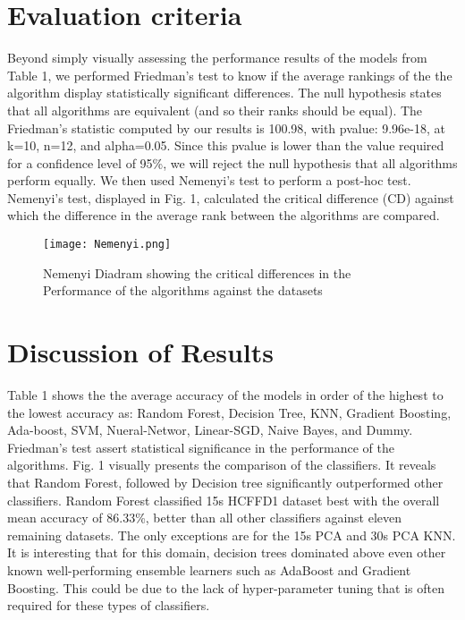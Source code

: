 \documentclass[conference]{IEEEtran}
\begin{document}
\section{Evaluation criteria}

Beyond simply visually assessing the performance results of the models from Table 1, we performed Friedman's test to know if the average rankings of the the algorithm display statistically significant differences. The null hypothesis states that all algorithms are equivalent (and so their ranks should be equal). The Friedman's statistic computed by our results is 100.98, with  pvalue: 9.96e-18, at k=10, n=12, and alpha=0.05. Since this pvalue is lower than the value required for a confidence level of 95\%, we will reject the null hypothesis that all algorithms perform equally. We then used Nemenyi's test to perform a post-hoc test. Nemenyi's test, displayed in Fig. 1, calculated the critical difference (CD) against which the difference in the average rank between the algorithms are compared.



\begin{figure}[]
 \centerline{\texttt{[image: Nemenyi.png]}}
\caption{Nemenyi Diadram showing the critical differences in the Performance of the algorithms against the datasets}
\end{figure}

\section{Discussion of Results}
Table 1 shows the the average accuracy of the models in order of the highest to the lowest accuracy as: Random Forest, Decision Tree, KNN, Gradient Boosting, Ada-boost, SVM, Nueral-Networ, Linear-SGD, Naive Bayes, and Dummy. Friedman's test assert statistical significance in the performance of the algorithms. Fig. 1 visually presents the comparison of the classifiers. It reveals that Random Forest, followed by Decision tree significantly outperformed other  classifiers. Random Forest classified 15s HCFFD1 dataset best with the overall mean accuracy of 86.33\%, better than all other classifiers against eleven remaining datasets. The only exceptions are for the 15s PCA and 30s PCA KNN. It is interesting that for this domain, decision trees dominated above even other known well-performing ensemble learners such as AdaBoost and Gradient Boosting. This could be due to the lack of hyper-parameter tuning that is often required for these types of classifiers.
\end{document}
